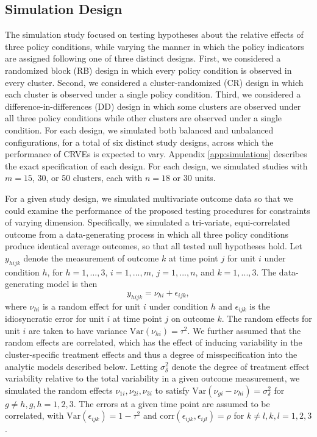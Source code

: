 \documentclass[draft]{ectaart}\usepackage[]{graphicx}\usepackage[]{color}
\newcommand{\Var}{\text{Var}}
\begin{document}
\subsection{Simulation Design}

The simulation study focused on testing hypotheses about the relative effects of three policy conditions, while varying the manner in which the policy indicators are assigned following one of three distinct designs. 
First, we considered a randomized block (RB) design in which every policy condition is observed in every cluster. 
Second, we considered a cluster-randomized (CR) design in which each cluster is observed under a single policy condition. 
Third, we considered a difference-in-differences (DD) design in which some clusters are observed under all three policy conditions while other clusters are observed under a single condition. 
For each design, we simulated both balanced and unbalanced configurations, for a total of six distinct study designs, across which the performance of CRVEs is expected to vary. 
Appendix \ref{app:simulations} describes the exact specification of each design. For each design, we simulated studies with $m = 15$, 30, or 50 clusters, each with $n = 18$ or 30 units.

For a given study design, we simulated multivariate outcome data so that we could examine the performance of the proposed testing procedures for constraints of varying dimension. 
Specifically, we simulated a tri-variate, equi-correlated outcome from a data-generating process in which all three policy conditions produce identical average outcomes, so that all tested null hypotheses hold. 
Let $y_{hijk}$ denote the measurement of outcome $k$ at time point $j$ for unit $i$ under condition $h$, for $h = 1,...,3$, $i = 1,...,m$, $j = 1,...,n$, and $k = 1,...,3$. 
The data-generating model is then 
\begin{equation}
\label{eq:data_generating_model}
y_{hijk} = \nu_{hi} + \epsilon_{ijk},
\end{equation}
where $\nu_{hi}$ is a random effect for unit $i$ under condition $h$ and $\epsilon_{ijk}$ is the idiosyncratic error for unit $i$ at time point $j$ on outcome $k$. 
The random effects for unit $i$ are taken to have variance $\Var\left(\nu_{hi}\right) = \tau^2$. 
We further assumed that the random effects are correlated, which has the effect of inducing variability in the cluster-specific treatment effects and thus a degree of misspecification into the analytic models described below. Letting $\sigma_\delta^2$ denote the degree of treatment effect variability relative to the total variability in a given outcome measurement, we simulated the random effects $\nu_{1i},\nu_{2i},\nu_{3i}$ to satisfy $\text{Var}\left(\nu_{gi} - \nu_{hi}\right) = \sigma_\delta^2$ for $g \neq h, g,h = 1,2,3$. 
The errors at a given time point are assumed to be correlated, with $\Var\left(\epsilon_{ijk}\right) = 1 - \tau^2$ and $\text{corr}\left(\epsilon_{ijk}, \epsilon_{ijl}\right) = \rho$ for $k\neq l, k,l = 1,2,3$. 
\end{document}
